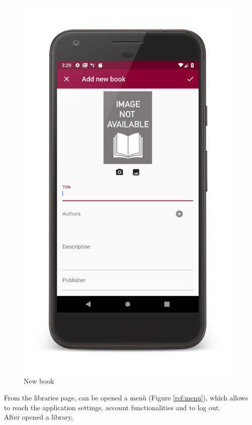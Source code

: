 \begin{figure}[!htb]
    \hfill
    \begin{minipage}[b]{0.3\textwidth}
        \centering
        \includegraphics[scale=0.09]{images/add-new-book-dialog.png}
        \caption{New book}
        \label{ref:addnewbook}
    \end{minipage}
\end{figure}
From the libraries page, can be opened a menù (Figure \ref{ref:menu}), which allows to reach the application settings, 
account functionalities and to log out.\\ After opened a library, 
